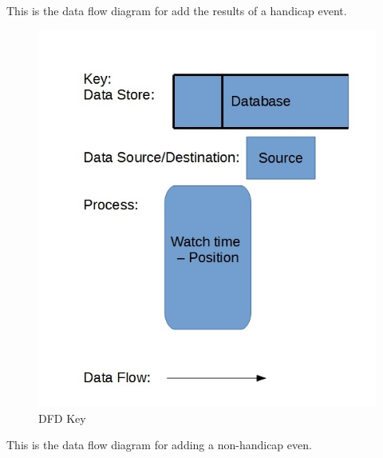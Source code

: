 This is the data flow diagram for add the results of a handicap event.



\begin{figure}[H]
    \includegraphics[width=\textwidth]{./DFD/Done/JPG/DFDKey.jpg}
    \caption{DFD Key} \label{fig:DFD key}
\end{figure}


This is the data flow diagram for adding a non-handicap even.


